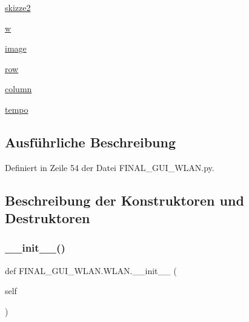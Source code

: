 \begin{DoxyCompactItemize}
\hyperlink{class_f_i_n_a_l___g_u_i___w_l_a_n_1_1_w_l_a_n_a16a45d3298b67d332cda2260c9dbecce}{skizze2}
\item 
\hyperlink{class_f_i_n_a_l___g_u_i___w_l_a_n_1_1_w_l_a_n_a03cca7b00a8470923485c6e196b063d6}{w}
\item 
\hyperlink{class_f_i_n_a_l___g_u_i___w_l_a_n_1_1_w_l_a_n_a17b149deff56b77cad88459300bbfaeb}{image}
\item 
\hyperlink{class_f_i_n_a_l___g_u_i___w_l_a_n_1_1_w_l_a_n_acfa0251fa33c37e6572e1e53403bee24}{row}
\item 
\hyperlink{class_f_i_n_a_l___g_u_i___w_l_a_n_1_1_w_l_a_n_af2837a964bb00f10eea62088e5df550a}{column}
\item 
\hyperlink{class_f_i_n_a_l___g_u_i___w_l_a_n_1_1_w_l_a_n_a8de62261cfda9f1ec5b09f9d99ef7492}{tempo}
\end{DoxyCompactItemize}


\subsection{Ausführliche Beschreibung}


Definiert in Zeile 54 der Datei F\+I\+N\+A\+L\+\_\+\+G\+U\+I\+\_\+\+W\+L\+A\+N.\+py.



\subsection{Beschreibung der Konstruktoren und Destruktoren}
\mbox{\label{class_f_i_n_a_l___g_u_i___w_l_a_n_1_1_w_l_a_n_abd0bb3e25ffdc1d77064fdbe4fae547c}} 
\subsubsection{\texorpdfstring{\+\_\+\+\_\+init\+\_\+\+\_\+()}{\_\_init\_\_()}}
{\footnotesize\ttfamily def F\+I\+N\+A\+L\+\_\+\+G\+U\+I\+\_\+\+W\+L\+A\+N.\+W\+L\+A\+N.\+\_\+\+\_\+init\+\_\+\+\_\+ (\begin{DoxyParamCaption}\item[{}]{self }\end{DoxyParamCaption})}




